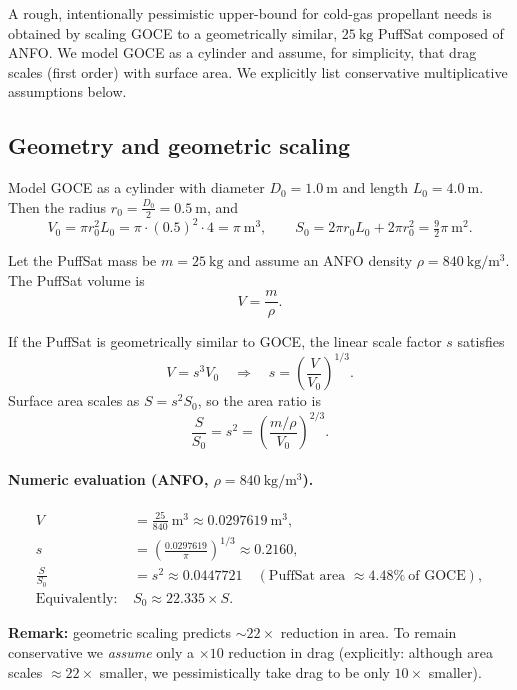 \documentclass{article}
\begin{document}
A rough, intentionally pessimistic upper-bound for cold-gas propellant needs is obtained by scaling GOCE to a geometrically similar, \(\SI{25}{\kg}\) PuffSat composed of ANFO.  We model GOCE as a cylinder and assume, for simplicity, that drag scales (first order) with surface area.  We explicitly list conservative multiplicative assumptions below.

\subsection*{Geometry and geometric scaling}
Model GOCE as a cylinder with diameter \(D_0=\SI{1.0}{\m}\) and length \(L_0=\SI{4.0}{\meter}\).  Then the radius \(r_0=\tfrac{D_0}{2}=\SI{0.5}{\meter}\), and
\[
V_0 = \pi r_0^2 L_0 = \pi\cdot(0.5)^2\cdot 4 = \pi\ \mathrm{m^3},
\qquad
S_0 = 2\pi r_0 L_0 + 2\pi r_0^2 = \tfrac{9}{2}\pi\ \mathrm{m^2}.
\]

Let the PuffSat mass be \(m=\SI{25}{\kg}\) and assume an ANFO density
\(\rho=\SI{840}{\kg\per\m^3}\).  The PuffSat volume is
\[
V=\frac{m}{\rho}.
\]

If the PuffSat is geometrically similar to GOCE, the linear scale factor \(s\) satisfies
\[
V = s^3 V_0
\quad\Longrightarrow\quad
s = \left(\frac{V}{V_0}\right)^{1/3}.
\]
Surface area scales as \(S = s^2 S_0\), so the area ratio is
\[
\frac{S}{S_0} = s^2 = \left(\frac{m/\rho}{V_0}\right)^{2/3}.
\]

\paragraph{Numeric evaluation (ANFO, \(\rho=\SI{840}{\kg\per\m^3}\)).}
\[
\begin{aligned}
V &= \frac{25}{840}\ \mathrm{m^3} \approx 0.0297619\ \mathrm{m^3},\\[4pt]
s &= \left(\frac{0.0297619}{\pi}\right)^{1/3} \approx 0.2160,\\[4pt]
\frac{S}{S_0} &= s^2 \approx 0.0447721 \quad(\text{PuffSat area } \approx 4.48\%\ \text{of GOCE}),\\[4pt]
\text{Equivalently: } & S_0 \approx 22.335 \times S.
\end{aligned}
\]

\noindent\textbf{Remark:} geometric scaling predicts \(\sim22\times\) reduction in area.  To remain conservative we \emph{assume} only a \(\times 10\) reduction in drag (explicitly: although area scales \(\approx22\times\) smaller, we pessimistically take drag to be only \(10\times\) smaller).
\end{document}
